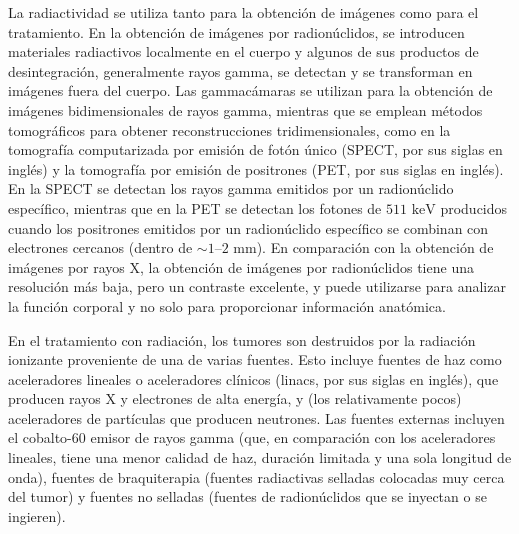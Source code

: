 \documentclass[12pt,a4paper]{book}
\begin{document}
La radiactividad se utiliza tanto para la obtención de imágenes como para el tratamiento. En la obtención de imágenes por radionúclidos, se introducen materiales radiactivos localmente en el cuerpo y algunos de sus productos de desintegración, generalmente rayos gamma, se detectan y se transforman en imágenes fuera del cuerpo. Las gammacámaras se utilizan para la obtención de imágenes bidimensionales de rayos gamma, mientras que se emplean métodos tomográficos para obtener reconstrucciones tridimensionales, como en la tomografía computarizada por emisión de fotón único (SPECT, por sus siglas en inglés) y la tomografía por emisión de positrones (PET, por sus siglas en inglés). En la SPECT se detectan los rayos gamma emitidos por un radionúclido específico, mientras que en la PET se detectan los fotones de $511\text{ keV}$ producidos cuando los positrones emitidos por un radionúclido específico se combinan con electrones cercanos (dentro de $\sim 1\text{--}2\text{ mm}$). En comparación con la obtención de imágenes por rayos X, la obtención de imágenes por radionúclidos tiene una resolución más baja, pero un contraste excelente, y puede utilizarse para analizar la función corporal y no solo para proporcionar información anatómica.

En el tratamiento con radiación, los tumores son destruidos por la radiación ionizante proveniente de una de varias fuentes. Esto incluye fuentes de haz como aceleradores lineales o aceleradores clínicos (linacs, por sus siglas en inglés), que producen rayos X y electrones de alta energía, y (los relativamente pocos) aceleradores de partículas que producen neutrones. Las fuentes externas incluyen el cobalto-60 emisor de rayos gamma (que, en comparación con los aceleradores lineales, tiene una menor calidad de haz, duración limitada y una sola longitud de onda), fuentes de braquiterapia (fuentes radiactivas selladas colocadas muy cerca del tumor) y fuentes no selladas (fuentes de radionúclidos que se inyectan o se ingieren).
\end{document}
